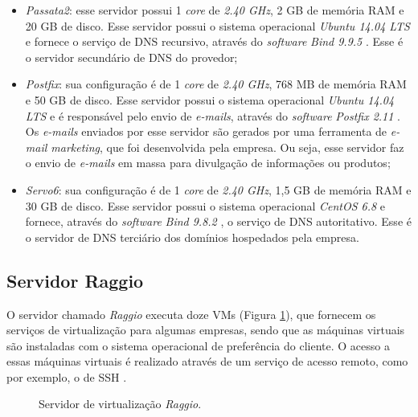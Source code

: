 \begin{itemize}
 \item \textit{Passata2}: esse servidor possui 1 \textit{core} de \textit{2.40 GHz}, 2 GB de memória \ac{RAM} e 20 GB de disco. 
 Esse servidor possui o sistema operacional \textit{Ubuntu 14.04 \ac{LTS}} \cite{ubuntu} e fornece o serviço de \ac{DNS} recursivo, através do 
 \textit{software} \textit{Bind 9.9.5} \cite{bind}. Esse é o servidor secundário de \ac{DNS} do provedor;
 
 \item \textit{Postfix}: sua configuração é de 1 \textit{core} de \textit{2.40 GHz}, 768 MB de memória \ac{RAM} e 50 GB de disco. 
 Esse servidor possui o sistema operacional \textit{Ubuntu 14.04 \ac{LTS}} \cite{ubuntu} e é responsável pelo envio de \textit{e-mails}, 
 através do \textit{software} \textit{Postfix 2.11} \cite{postfix}. Os \textit{e-mails} enviados por esse servidor são gerados por uma 
 ferramenta de \textit{e-mail marketing}, que foi desenvolvida pela empresa. Ou seja, esse servidor faz o envio de \textit{e-mails} em massa 
 para divulgação de informações ou produtos;
 
 \item \textit{Servo6}: sua configuração é de 1 \textit{core} de \textit{2.40 GHz}, 1,5 GB de memória \ac{RAM} e 30 GB de disco. 
 Esse servidor possui o sistema operacional \textit{CentOS 6.8} e fornece, através do \textit{software} \textit{Bind 9.8.2} \cite{bind}, o 
 serviço de \ac{DNS} autoritativo. Esse é o servidor de \ac{DNS} terciário dos domínios hospedados pela empresa.
\end{itemize}

\subsection{Servidor Raggio}
\label{section:serv_raggio}

O servidor chamado \textit{Raggio} executa doze \ac{VM}s (Figura \ref{fig:servidor_raggio}), que fornecem os serviços de virtualização para algumas empresas,
sendo que as máquinas virtuais são instaladas com o sistema operacional de preferência do cliente. O acesso a essas máquinas virtuais é realizado
através de um serviço de acesso remoto, como por exemplo, o de \ac{SSH} \cite{barrett2005}.

\begin{figure}[h!]
 \centering
 \caption{Servidor de virtualização \textit{Raggio}.}
 \label{fig:servidor_raggio}
\end{figure}


